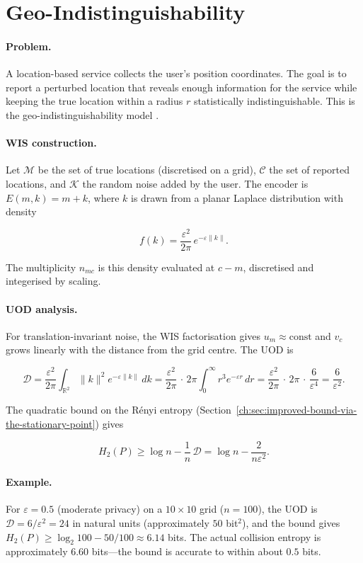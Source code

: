 \section{Geo-Indistinguishability}\label{ch:sec:app-geo-indistinguishability}
\label{sec:app-geo}

\paragraph{Problem.}
A location-based service collects the user's position
coordinates.  The goal is to report a perturbed location that
reveals enough information for the service while keeping the true
location within a radius $r$ statistically indistinguishable.
This is the geo-indistinguishability model \cite{andres2013geo}.

\paragraph{WIS construction.}
Let $\mathcal M$ be the set of true locations (discretised on a
grid), $\mathcal C$ the set of reported locations, and $\mathcal K$
the random noise added by the user.  The encoder is
$E(m,k)=m+k$, where $k$ is drawn from a planar Laplace
distribution with density

\[
f(k) = \frac{\varepsilon^2}{2\pi}\,e^{-\varepsilon\|k\|}.
\]

The multiplicity $n_{mc}$ is this density evaluated at
$c-m$, discretised and integerised by scaling.

\paragraph{UOD analysis.}
For translation-invariant noise, the WIS factorisation gives
$u_m\approx\text{const}$ and $v_c$ grows linearly with the
distance from the grid centre.  The UOD is

\[
\mathcal D = \frac{\varepsilon^2}{2\pi}
\int_{\mathbb R^2} \|k\|^2 e^{-\varepsilon\|k\|}\,dk
= \frac{\varepsilon^2}{2\pi}\,\cdot\,2\pi
\int_0^\infty r^3 e^{-\varepsilon r}\,dr
= \frac{\varepsilon^2}{2\pi}\,\cdot\,2\pi\,\cdot\,\frac{6}{\varepsilon^4}
= \frac{6}{\varepsilon^2}.
\]

The quadratic bound on the R\'enyi entropy (Section~\ref{ch:sec:improved-bound-via-the-stationary-point}) gives

\[
H_2(P) \ge \log n - \frac{1}{n}\,\mathcal D
= \log n - \frac{2}{n\varepsilon^2}.
\]

\paragraph{Example.}
For $\varepsilon=0.5$ (moderate privacy) on a $10\times10$ grid
($n=100$), the UOD is $\mathcal D = 6/\varepsilon^2 = 24$ in
natural units (approximately $50$ bit$^2$), and the bound gives
$H_2(P) \ge \log_2 100 - 50/100 \approx 6.14$ bits.  The actual
collision entropy is approximately $6.60$ bits---the bound is
accurate to within about $0.5$ bits.

